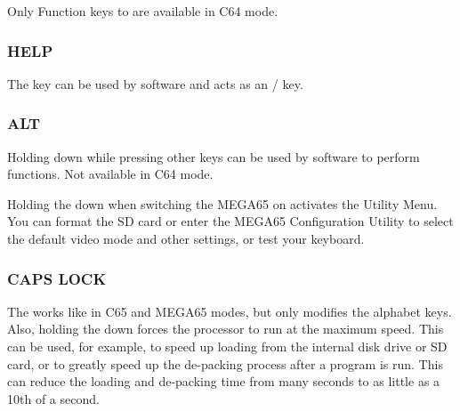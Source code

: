 Only Function keys  to  are available in C64 mode.

\subsubsection{HELP}

The  key can be used by software and acts as an  /  key.

\subsubsection{ALT}

Holding  down while pressing other keys can be used by software to perform functions. Not available in C64 mode.

Holding the  down when switching the MEGA65 on activates the Utility Menu. You can format the SD card or enter the MEGA65 Configuration Utility to select the default video mode and other settings, or test your keyboard.

\subsubsection{CAPS LOCK}

The  works like  in C65 and MEGA65 modes, but only modifies the alphabet keys.
Also, holding the  down forces the processor to run at the maximum speed. This can be used, for example,
to speed up loading from the internal disk drive or SD card, or to greatly speed up the de-packing process after a program is run.
This can reduce the loading and de-packing time from many seconds to as little as a 10th of a second.
